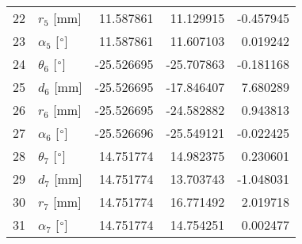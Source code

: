 \documentclass{standalone}%
\begin{document}
\begin{tabular}{llrrr}
22 &              $r_{5}$ [mm] &  11.587861 &  11.129915 &  -0.457945 \\
23 &  $\alpha_{5}$ [$\degree$] &  11.587861 &  11.607103 &   0.019242 \\
24 &  $\theta_{6}$ [$\degree$] & -25.526695 & -25.707863 &  -0.181168 \\
25 &              $d_{6}$ [mm] & -25.526695 & -17.846407 &   7.680289 \\
26 &              $r_{6}$ [mm] & -25.526695 & -24.582882 &   0.943813 \\
27 &  $\alpha_{6}$ [$\degree$] & -25.526696 & -25.549121 &  -0.022425 \\
28 &  $\theta_{7}$ [$\degree$] &  14.751774 &  14.982375 &   0.230601 \\
29 &              $d_{7}$ [mm] &  14.751774 &  13.703743 &  -1.048031 \\
30 &              $r_{7}$ [mm] &  14.751774 &  16.771492 &   2.019718 \\
31 &  $\alpha_{7}$ [$\degree$] &  14.751774 &  14.754251 &   0.002477 \\
\bottomrule
\end{tabular}
%
\end{document}
